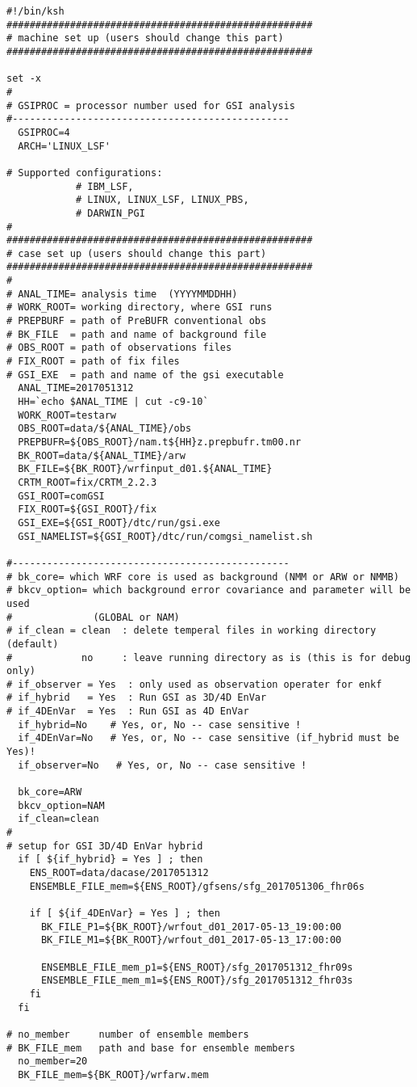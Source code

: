 \begin{footnotesize}
\begin{verbatim}
#!/bin/ksh
#####################################################
# machine set up (users should change this part)
#####################################################

set -x
#
# GSIPROC = processor number used for GSI analysis
#------------------------------------------------
  GSIPROC=4
  ARCH='LINUX_LSF'

# Supported configurations:
            # IBM_LSF,
            # LINUX, LINUX_LSF, LINUX_PBS,
            # DARWIN_PGI
#
#####################################################
# case set up (users should change this part)
#####################################################
#
# ANAL_TIME= analysis time  (YYYYMMDDHH)
# WORK_ROOT= working directory, where GSI runs
# PREPBURF = path of PreBUFR conventional obs
# BK_FILE  = path and name of background file
# OBS_ROOT = path of observations files
# FIX_ROOT = path of fix files
# GSI_EXE  = path and name of the gsi executable
  ANAL_TIME=2017051312
  HH=`echo $ANAL_TIME | cut -c9-10`
  WORK_ROOT=testarw
  OBS_ROOT=data/${ANAL_TIME}/obs
  PREPBUFR=${OBS_ROOT}/nam.t${HH}z.prepbufr.tm00.nr
  BK_ROOT=data/${ANAL_TIME}/arw
  BK_FILE=${BK_ROOT}/wrfinput_d01.${ANAL_TIME}
  CRTM_ROOT=fix/CRTM_2.2.3
  GSI_ROOT=comGSI
  FIX_ROOT=${GSI_ROOT}/fix
  GSI_EXE=${GSI_ROOT}/dtc/run/gsi.exe
  GSI_NAMELIST=${GSI_ROOT}/dtc/run/comgsi_namelist.sh

#------------------------------------------------
# bk_core= which WRF core is used as background (NMM or ARW or NMMB)
# bkcv_option= which background error covariance and parameter will be used
#              (GLOBAL or NAM)
# if_clean = clean  : delete temperal files in working directory (default)
#            no     : leave running directory as is (this is for debug only)
# if_observer = Yes  : only used as observation operater for enkf
# if_hybrid   = Yes  : Run GSI as 3D/4D EnVar
# if_4DEnVar  = Yes  : Run GSI as 4D EnVar
  if_hybrid=No    # Yes, or, No -- case sensitive !
  if_4DEnVar=No   # Yes, or, No -- case sensitive (if_hybrid must be Yes)!
  if_observer=No   # Yes, or, No -- case sensitive !

  bk_core=ARW
  bkcv_option=NAM
  if_clean=clean
#
# setup for GSI 3D/4D EnVar hybrid
  if [ ${if_hybrid} = Yes ] ; then
    ENS_ROOT=data/dacase/2017051312
    ENSEMBLE_FILE_mem=${ENS_ROOT}/gfsens/sfg_2017051306_fhr06s

    if [ ${if_4DEnVar} = Yes ] ; then
      BK_FILE_P1=${BK_ROOT}/wrfout_d01_2017-05-13_19:00:00
      BK_FILE_M1=${BK_ROOT}/wrfout_d01_2017-05-13_17:00:00

      ENSEMBLE_FILE_mem_p1=${ENS_ROOT}/sfg_2017051312_fhr09s
      ENSEMBLE_FILE_mem_m1=${ENS_ROOT}/sfg_2017051312_fhr03s
    fi
  fi

# no_member     number of ensemble members
# BK_FILE_mem   path and base for ensemble members
  no_member=20
  BK_FILE_mem=${BK_ROOT}/wrfarw.mem
\end{verbatim}
\end{footnotesize}


